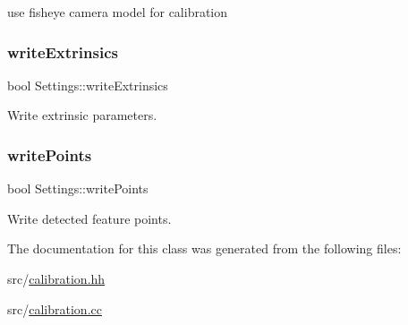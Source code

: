 use fisheye camera model for calibration 

\mbox{\label{class_settings_a1cee56847e08f49c90d2f7e2b0511197}} 
\subsubsection{\texorpdfstring{write\+Extrinsics}{writeExtrinsics}}
{\footnotesize\ttfamily bool Settings\+::write\+Extrinsics}



Write extrinsic parameters. 

\mbox{\label{class_settings_a53ac449815682c6bfae7e50944ba0565}} 
\subsubsection{\texorpdfstring{write\+Points}{writePoints}}
{\footnotesize\ttfamily bool Settings\+::write\+Points}



Write detected feature points. 



The documentation for this class was generated from the following files\+:\begin{DoxyCompactItemize}
\item 
src/\mbox{\hyperlink{calibration_8hh}{calibration.\+hh}}\item 
src/\mbox{\hyperlink{calibration_8cc}{calibration.\+cc}}\end{DoxyCompactItemize}

